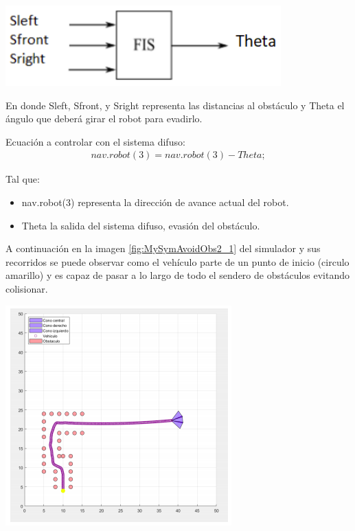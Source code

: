 \begin{center}
    \includegraphics[scale=0.5]{Tesis/Capitulos/04_CAPITULO_2/img/esquema1.png}
\end{center}

En donde Sleft, Sfront, y Sright representa las distancias al obstáculo y Theta el ángulo que deberá girar el robot para evadirlo.

Ecuación a controlar con el sistema difuso:
\begin{equation}\boxed{
\begin{array}{rcl}
nav.robot(3) = nav.robot(3) - Theta;
\end{array}}
\end{equation}

Tal que:
\begin{itemize}
    \item nav.robot(3) representa la dirección de avance actual del robot.
    \item Theta la salida del sistema difuso, evasión del obstáculo.
\end{itemize}

A continuación en la imagen \ref{fig:MySymAvoidObs2_1} del simulador y sus recorridos se puede observar como el vehículo parte de un punto de inicio (circulo amarillo) y es capaz de pasar a lo largo de todo el sendero de obstáculos evitando colisionar. 

\begin{center}
    \includegraphics[scale=0.5]{Tesis/Capitulos/04_CAPITULO_2/img/res_1.png}
    \label{fig:MySymAvoidObs2_1}
\end{center}

